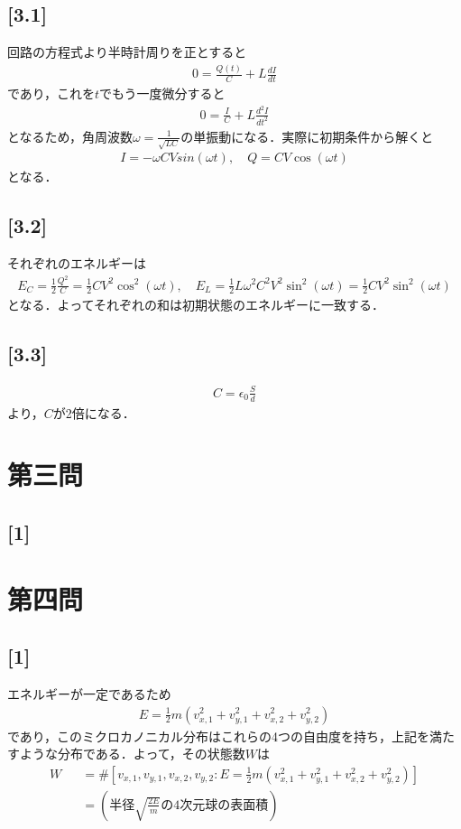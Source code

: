 \documentclass[12pt,dvipdfmx]{jsarticle}
\begin{document}
\subsection*{\large{[3.1]}}
回路の方程式より半時計周りを正とすると
\begin{eqnarray}
  0 = \frac{Q(t)}{C} + L \frac{dI}{dt}
\end{eqnarray}
であり，これを$t$でもう一度微分すると
\begin{eqnarray}
  0 = \frac{I}{C} + L \frac{d^2 I}{dt^2}
\end{eqnarray}
となるため，角周波数$\omega = \frac{1}{\sqrt{LC}}$の単振動になる．実際に初期条件から解くと
\begin{eqnarray}
  I = -\omega CV sin(\omega t),\quad Q = CV \cos(\omega t)
\end{eqnarray}
となる．
\subsection*{\large{[3.2]}}
それぞれのエネルギーは
\begin{eqnarray}
  E_C = \frac{1}{2}\frac{Q^2}{C} = \frac{1}{2}CV^2 \cos^2 (\omega t),\quad E_L = \frac{1}{2}L\omega^2 C^2 V^2 \sin^2 (\omega t) =  \frac{1}{2}CV^2 \sin^2 (\omega t)
\end{eqnarray}
となる．よってそれぞれの和は初期状態のエネルギーに一致する．
\subsection*{\large{[3.3]}}
\begin{eqnarray}
  C = \epsilon_0 \frac{S}{d}
\end{eqnarray}
より，$C$が2倍になる．
\newpage
\section*{\Large{第三問}}
\subsection*{\large{[1]}}

\newpage

\section*{\Large{第四問}}
\subsection*{\large{[1]}}
エネルギーが一定であるため
\begin{eqnarray}
  E = \frac{1}{2}m\left( v_{x,1}^2 + v_{y,1}^2 + v_{x,2}^2 + v_{y,2}^2 \right)
\end{eqnarray}
であり，このミクロカノニカル分布はこれらの4つの自由度を持ち，上記を満たすような分布である．よって，その状態数$W$は
\begin{eqnarray}
  W &&= \# \left[ v_{x,1},v_{y,1},v_{x,2},v_{y,2} : E = \frac{1}{2}m\left( v_{x,1}^2 + v_{y,1}^2 + v_{x,2}^2 + v_{y,2}^2 \right) \right]\\
  &&=\left( 半径 \sqrt{\frac{2E}{m}}の4次元球の表面積 \right)
\end{eqnarray}
\end{document}

